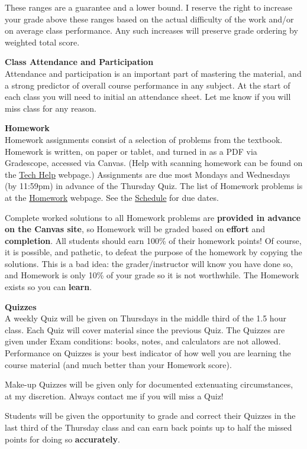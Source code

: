 \documentclass[12pt]{article}
\renewcommand{\emph}[1]{\textsf{\textbf{#1}}}
\newcommand{\localhead}[1]{\par\smallskip\textbf{#1} \smallskip\nobreak\\}%
\def\heading#1{\localhead{\large\emph{#1}}}
\begin{document}
These ranges are a guarantee and a lower bound. I reserve the right to increase your grade above these ranges based on the actual difficulty of the work and/or on average class performance. Any such increases will preserve grade ordering by weighted total score. 


\heading{Class Attendance and Participation}
Attendance and participation is an important part of mastering the material, and a strong predictor of overall course performance in any subject.  At the start of each class you will need to initial an attendance sheet.  Let me know if you will miss class for any reason.


\heading{Homework}
Homework assignments consist of a selection of problems from the textbook.  Homework is written, on paper or tablet, and turned in as a PDF via Gradescope, accessed via Canvas.  (Help with scanning homework can be found on the \href{https://uaf-math251.github.io/techHelp.html}{Tech Help} webpage.)  Assignments are due most Mondays and Wednesdays (by 11:59pm) in advance of the Thursday Quiz.  The list of Homework problems is at the \href{https://bueler.github.io/calc2/writtenhomework.html}{Homework} webpage.  See the \href{https://bueler.github.io/calc2/schedule.pdf}{Schedule} for due dates.

Complete worked solutions to all Homework problems are \emph{provided in advance on the Canvas site}, so Homework will be graded based on \emph{effort} and \emph{completion}.  All students should earn 100\% of their homework points!  Of course, it is possible, and pathetic, to defeat the purpose of the homework by copying the solutions.  This is a bad idea: the grader/instructor will know you have done so, and Homework is only 10\% of your grade so it is not worthwhile.  The Homework exists so you can \emph{learn}.


\heading{Quizzes}
A weekly Quiz will be given on Thursdays in the middle third of the 1.5 hour class.  Each Quiz will cover material since the previous Quiz.  The Quizzes are given under Exam conditions: books, notes, and calculators are not allowed.  Performance on Quizzes is your best indicator of how well you are learning the course material (and much better than your Homework score).

Make-up Quizzes will be given only for documented extenuating circumstances, at my discretion.  Always contact me if you will miss a Quiz!

Students will be given the opportunity to grade and correct their Quizzes in the last third of the Thursday class and can earn back points up to half the missed points for doing so \emph{accurately}.
\end{document}
